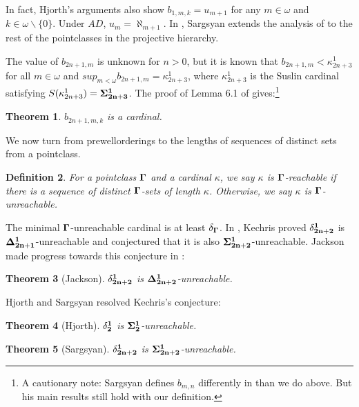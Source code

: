 \documentclass[12pt]{article}
\newtheorem{theorem}{Theorem}[section]
\newtheorem{definition}[theorem]{Definition}
\begin{document}
{In fact, Hjorth's arguments also show $b_{1,m,k} = u_{m+1}$ for any $m\in \omega$ and $k\in\omega\backslash\{0\}$. Under $AD$, $u_m = \aleph_{m+1}$. In \cite{on_the_pwo}, Sargsyan extends the analysis of \cite{bddness_lemma} to the rest of the pointclasses in the projective hierarchy.

The value of $b_{2n+1,m}$ is unknown for $n>0$, but it is known that $b_{2n+1,m} < \kappa^1_{2n+3}$ for all $m\in\omega$ and $sup_{m<\omega} b_{2n+1,m} = \kappa^1_{2n+3}$, where $\kappa^1_{2n+3}$ is the Suslin cardinal satisfying $S(\kappa^1_{2n+3}) = \bf{\Sigma^1_{2n+3}}$.
The proof of 
Lemma 6.1 of \cite{on_the_pwo} gives:\footnote{A cautionary note: Sargsyan defines $b_{m,n}$ differently in \cite{on_the_pwo} than we do above. But his main results still hold with our definition.}
\begin{theorem}
\label{b is cardinal}
    $b_{2n+1,m,k}$ is a cardinal.
\end{theorem}

We now turn from prewellorderings to the lengths of sequences of distinct sets from a pointclass.

\begin{definition}
    For a pointclass $\bf{\Gamma}$ and a cardinal $\kappa$, we say $\kappa$ is $\bf{\Gamma}$-reachable if there is a sequence of distinct $\bf{\Gamma}$-sets of length $\kappa$. Otherwise, we say $\kappa$ is $\bf{\Gamma}$-unreachable.
\end{definition}

The minimal $\bf{\Gamma}$-unreachable cardinal is at least $\bf{\delta_\Gamma}$. In \cite{Kechris}, Kechris proved $\bf{\delta^1_{2n+2}}$ is $\bf{\Delta^1_{2n+1}}$-unreachable and conjectured that it is also $\bf{\Sigma^1_{2n+2}}$-unreachable. Jackson made progress towards this conjecture in \cite{Jackson}:

\begin{theorem}[Jackson]
    $\bf{\delta^1_{2n+2}}$ is $\bf{\Delta^1_{2n+2}}$-unreachable.
\end{theorem}

Hjorth and Sargsyan resolved Kechris's conjecture:

\begin{theorem}[Hjorth]
\label{hjorth unreachability thm}
    $\bf{\delta^1_2}$ is $\bf{\Sigma^1_2}$-unreachable.
\end{theorem}

\begin{theorem}[Sargsyan]
\label{grigor unreachability thm}
    $\bf{\delta^1_{2n+2}}$ is $\bf{\Sigma^1_{2n+2}}$-unreachable.
\end{theorem}

}
\end{document}
